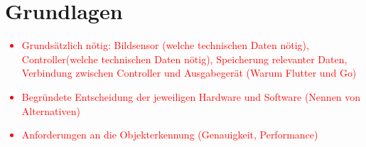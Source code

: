 \section{Grundlagen}\label{ch:Grundlagen}

\textcolor{red}{
	\begin{itemize}
		\item Grundsätzlich nötig: Bildsensor (welche technischen Daten nötig), Controller(welche technischen Daten nötig), Speicherung relevanter Daten, Verbindung zwischen Controller und Ausgabegerät (Warum Flutter und Go)
		\item Begründete Entscheidung der jeweiligen Hardware und Software (Nennen von Alternativen)
		\item Anforderungen an die Objekterkennung (Genauigkeit, Performance)
	\end{itemize}
}
